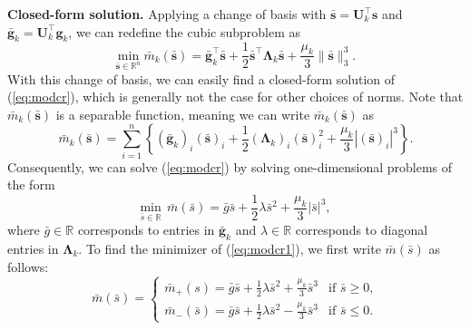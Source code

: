  \noindent \textbf{Closed-form solution.} 
 Applying a change of basis with
$\bar{\mathbf{s}} = \mathbf{U}_k^{\top} \mathbf{s}$ and 
$\bar{\mathbf{g}}_k = \mathbf{U}_k^{\top}\mathbf{g}_k$, 
we can redefine the cubic subproblem as
\begin{equation}\label{eq:modcr}
	\underset{\bar{\mathbf{s}} \in \mathbb{R}^n}{\text{min}}  \ \bar{{m}}_{k} (\bar{\mathbf{s}})
	= \bar{\mathbf{g}}_k^\top\bar{\mathbf{s}}
	+ \frac{1}{2}\bar{\mathbf{s}}^\top \mathbf{\Lambda}_k\bar{\mathbf{s}}
	+ \frac{\mu_k}{3}\|\bar{\mathbf{s}}\|_3^3.
\end{equation}
With this change of basis, we can easily find a closed-form solution of (\ref{eq:modcr}), which is generally not the case for other choices of norms.  
Note that $\bar{m}_k(\bar{\mathbf{s}})$ is a separable function,  
meaning we can write $\bar{m}_k(\bar{\mathbf{s}})$ as
$$
	\bar{m}_k(\bar{\mathbf{s}})
	=
	\sum_{i=1}^n
	\left \{
	(\bar{\mathbf{g}}_k)_i (\bar{\mathbf{s}})_i
	+
	\frac{1}{2}(\mathbf{\Lambda}_k)_i(\bar{\mathbf{s}})_i^2
	+
	\frac{\mu_k}{3} |(\bar{\mathbf{s}})_i |^3
	\right \}.
$$
Consequently, we can  solve (\ref{eq:modcr}) by solving one-dimensional problems 
of the form 
\begin{equation}\label{eq:modcr1}
	\underset{\bar{s} \in \mathbb{R}}{\text{min}}  \ \ \bar{m}(\bar{s})
	= \bar{g} \bar{s}   
	+ \frac{1}{2}\lambda \bar{s}^2
	+ \frac{\mu_k}{3}|\bar{s}|^3,
\end{equation}
where $\bar{g} \in \mathbb{R}$ corresponds to entries in $\bar{\mathbf{g}}_k$ and
$\lambda \in \mathbb{R}$ corresponds to diagonal entries in $\mathbf{\Lambda}_k$.  
To find the minimizer of (\ref{eq:modcr1}), we first write $\bar{m}(\bar{s})$ as follows:
\begin{equation*}
	\bar{m}(\bar{s}) = 
	\begin{cases}
		\bar{m}_+(s) = \bar{g} \bar{s}  
	+ \frac{1}{2}\lambda \bar{s}^2
	+ \frac{\mu_k}{3}\bar{s}^3 & \text{if $\bar{s} \ge 0$}, \\
		\bar{m}_-(\bar{s}) = \bar{g}\bar{s}  
	+ \frac{1}{2}\lambda \bar{s}^2
	- \frac{\mu_k}{3}\bar{s}^3 & \text{if $\bar{s} \le 0$}. 	
	\end{cases}
\end{equation*}
